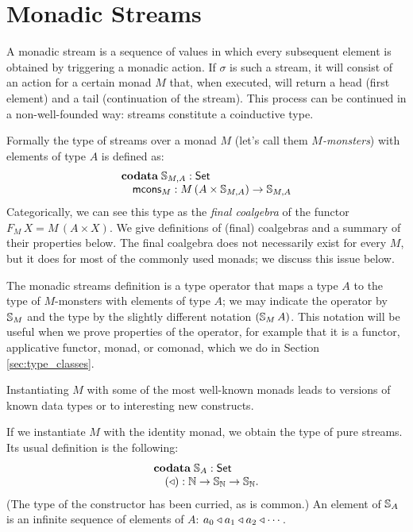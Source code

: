 \section{Monadic Streams}\label{sec:mstreams}

A monadic stream is a sequence of values in which every subsequent element is obtained by triggering a monadic action.
If $\sigma$ is such a stream, it will consist of an action for a certain monad $M$ that, when executed, will return a head (first element) and a tail (continuation of the stream).
This process can be continued in a non-well-founded way: streams constitute a coinductive type.

Formally the type of streams over a monad $M$ (let's call them {\em $M$-monsters}) with elements of type $A$ is defined as:
$$
\begin{array}[t]{l}
\mathbf{codata}\;
\mathbb{S}_{M,A}:\mathsf{Set}\\
\quad \mathsf{mcons}_M: M\,(A\times \mathbb{S}_{M,A})\rightarrow\mathbb{S}_{M,A}
\end{array}
$$
Categorically, we can see this type as the {\em final coalgebra} of the functor $F_M\,X = M\,(A\times X)$.
We give definitions of (final) coalgebras and a summary of their properties below.
The final coalgebra does not necessarily exist for every $M$, 
but it does for most of the commonly used monads;
we discuss this issue below.

The monadic streams definition is a type operator that maps a type $A$ to the type of $M$-monsters with elements of type $A$; we may indicate the operator by $\mathbb{S}_{M}$ and the type by the slightly different notation $(\mathbb{S}_{M}\,A)$.
This notation will be useful when we prove properties of the operator, for example that it is a functor, applicative functor, monad, or comonad, which we do in Section \ref{sec:type_classes}.

Instantiating $M$ with some of the most well-known monads leads to versions of known data types or to interesting new constructs.

If we instantiate $M$ with the identity monad, we obtain the type of pure streams.
Its usual definition is the following:
$$
\begin{array}[t]{l}
\mathbf{codata}\;
\mathbb{S}_{A}:\mathsf{Set}\\
\quad (\triangleleft): \mathbb{N}\rightarrow \mathbb{S}_{\mathbb{N}} \rightarrow\mathbb{S}_{\mathbb{N}}.
\end{array}
$$
(The type of the constructor has been curried, as is common.)
An element of $\mathbb{S}_{A}$ is an infinite sequence of elements of $A$: $a_0 \triangleleft a_1\triangleleft a_2\triangleleft \cdots$.

